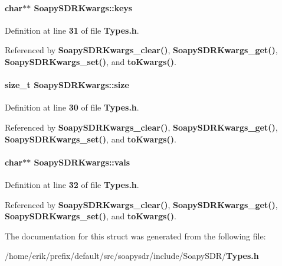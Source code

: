 \paragraph[{keys}]{\setlength{\rightskip}{0pt plus 5cm}char$\ast$$\ast$ Soapy\+S\+D\+R\+Kwargs\+::keys}\label{structSoapySDRKwargs_ab65d41cca0af0c4b62a0651fd2c752ca}


Definition at line {\bf 31} of file {\bf Types.\+h}.



Referenced by {\bf Soapy\+S\+D\+R\+Kwargs\+\_\+clear()}, {\bf Soapy\+S\+D\+R\+Kwargs\+\_\+get()}, {\bf Soapy\+S\+D\+R\+Kwargs\+\_\+set()}, and {\bf to\+Kwargs()}.

\paragraph[{size}]{\setlength{\rightskip}{0pt plus 5cm}size\+\_\+t Soapy\+S\+D\+R\+Kwargs\+::size}\label{structSoapySDRKwargs_a76226fa23921cbbb41f0f2179697fd41}


Definition at line {\bf 30} of file {\bf Types.\+h}.



Referenced by {\bf Soapy\+S\+D\+R\+Kwargs\+\_\+clear()}, {\bf Soapy\+S\+D\+R\+Kwargs\+\_\+get()}, {\bf Soapy\+S\+D\+R\+Kwargs\+\_\+set()}, and {\bf to\+Kwargs()}.

\paragraph[{vals}]{\setlength{\rightskip}{0pt plus 5cm}char$\ast$$\ast$ Soapy\+S\+D\+R\+Kwargs\+::vals}\label{structSoapySDRKwargs_a9a27e6e8523613646f2c25a6d802128b}


Definition at line {\bf 32} of file {\bf Types.\+h}.



Referenced by {\bf Soapy\+S\+D\+R\+Kwargs\+\_\+clear()}, {\bf Soapy\+S\+D\+R\+Kwargs\+\_\+get()}, {\bf Soapy\+S\+D\+R\+Kwargs\+\_\+set()}, and {\bf to\+Kwargs()}.



The documentation for this struct was generated from the following file\+:\begin{DoxyCompactItemize}
\item 
/home/erik/prefix/default/src/soapysdr/include/\+Soapy\+S\+D\+R/{\bf Types.\+h}\end{DoxyCompactItemize}
